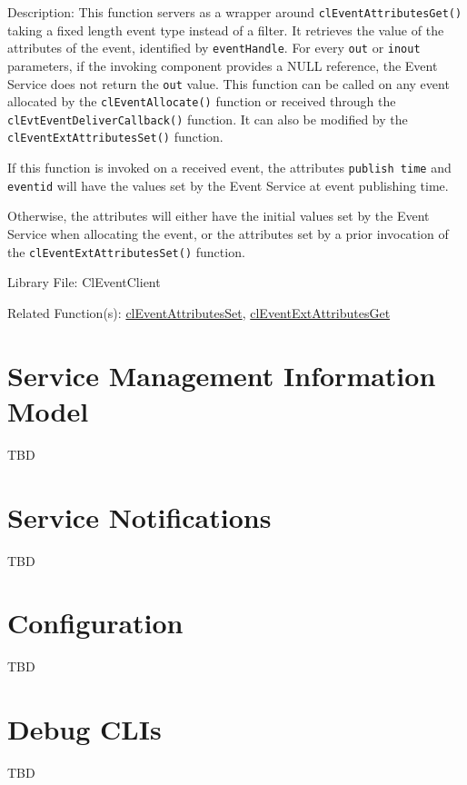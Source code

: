 \begin{flushleft}
\begin{Desc}
\item[Description:]This function servers as a wrapper around {\tt{clEventAttributesGet()}} taking a fixed length event type instead of a filter. It 
retrieves the
value of the attributes of the event, identified by {\tt{eventHandle}}. For every {\tt{out}} or {\tt{inout}} parameters, if the invoking component
provides 
a NULL reference, the Event Service does not return the {\tt{out}} value. This function can be called on any event allocated by the {\tt{clEventAllocate()}} 
function or 
received through the {\tt{clEvtEventDeliverCallback()}} function. It can also be modified by the {\tt{clEventExtAttributesSet()}} function. 
\par
If this function is invoked on a received event, the attributes {\tt{publish time}} and {\tt{eventid}} will have the values set by the Event Service at 
event publishing time. 
\par
Otherwise, the attributes will either have the initial values set by the Event Service when allocating the event, or the attributes set by a prior 
invocation of the 
{\tt{clEventExtAttributesSet()}} function. 
\end{Desc}

\begin{Desc}
\item[Library File:]Cl\-Event\-Client\end{Desc}
\begin{Desc}
\item[Related Function(s):]\hyperlink{pageem109}{cl\-Event\-Attributes\-Set}, \hyperlink{pageem204}{cl\-Event\-Ext\-Attributes\-Get} \end{Desc}


\chapter{Service Management Information Model}
TBD

\chapter{Service Notifications}
TBD

\chapter{Configuration}
TBD


\chapter{Debug CLIs}
TBD

\end{flushleft}